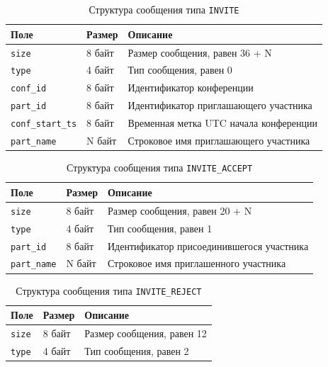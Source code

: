 \begin{table}[H]
  \centering
  \caption{Структура сообщения типа \texttt{INVITE}}
  \label{tbl:msg:invite}
  \begin{tabular}{|l|l|l|}
    \hline
    \textbf{Поле} & \textbf{Размер} & \textbf{Описание} \\ \hline
    \texttt{size} & 8 байт & Размер сообщения, равен 36 + N \\ \hline
    \texttt{type} & 4 байт & Тип сообщения, равен 0 \\ \hline
    \texttt{conf\_id} & 8 байт & Идентификатор конференции \\ \hline
    \texttt{part\_id} & 8 байт & Идентификатор приглашающего участника \\ \hline
    \texttt{conf\_start\_ts} & 8 байт & Временная метка UTC начала конференции \\ \hline
    \texttt{part\_name} & N байт & Строковое имя приглашающего участника \\ \hline
  \end{tabular}
\end{table}

\begin{table}[H]
  \centering
  \caption{Структура сообщения типа \texttt{INVITE\_ACCEPT}}
  \label{tbl:msg:invite-accept}
  \begin{tabular}{|l|l|l|}
    \hline
    \textbf{Поле} & \textbf{Размер} & \textbf{Описание} \\ \hline
    \texttt{size} & 8 байт & Размер сообщения, равен 20 + N \\ \hline
    \texttt{type} & 4 байт & Тип сообщения, равен 1 \\ \hline
    \texttt{part\_id} & 8 байт & Идентификатор присоединившегося участника \\ \hline
    \texttt{part\_name} & N байт & Строковое имя приглашенного участника \\ \hline
  \end{tabular}
\end{table}

\begin{table}[H]
  \centering
  \caption{Структура сообщения типа \texttt{INVITE\_REJECT}}
  \label{tbl:msg:invite-reject}
  \begin{tabular}{|l|l|l|}
    \hline
    \textbf{Поле} & \textbf{Размер} & \textbf{Описание} \\ \hline
    \texttt{size} & 8 байт & Размер сообщения, равен 12 \\ \hline
    \texttt{type} & 4 байт & Тип сообщения, равен 2 \\ \hline
  \end{tabular}
\end{table}

